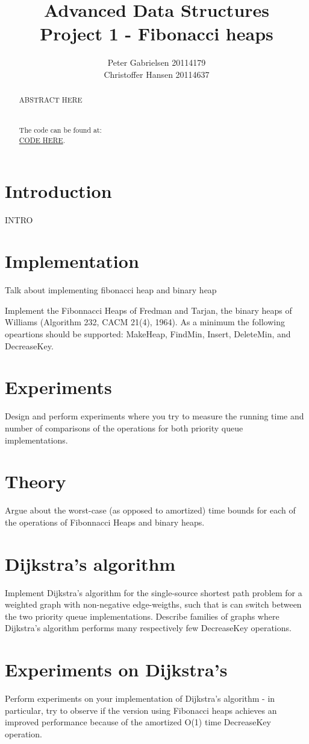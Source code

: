 \documentclass[a4paper,oneside,article,11pt]{memoir}
\title{Advanced Data Structures \\ Project 1 - Fibonacci heaps}
\author{Peter Gabrielsen 20114179 \\
Christoffer Hansen 20114637}
\begin{document}
\begin{titlingpage}
\clearpage

\maketitle
\thispagestyle{empty}

\begin{abstract}
ABSTRACT HERE
\\
\\
\\
The code can be found at: \\\url{CODE HERE}.
\end{abstract}
\end{titlingpage}

\pagebreak

\tableofcontents

\pagebreak

\chapter{Introduction}
INTRO

\chapter{Implementation}
Talk about implementing fibonacci heap and binary heap

Implement
the Fibonnacci Heaps of Fredman and Tarjan,
the binary heaps of Williams (Algorithm 232, CACM 21(4), 1964).
As a minimum the following opeartions should be supported: MakeHeap, FindMin, Insert, DeleteMin, and DecreaseKey.

\chapter{Experiments}
Design and perform experiments where you try to measure the running time and number of comparisons of the operations for both priority queue implementations.

\chapter{Theory}
Argue about the worst-case (as opposed to amortized) time bounds for each of the operations of Fibonnacci Heaps and binary heaps.

\chapter{Dijkstra's algorithm}
Implement Dijkstra's algorithm for the single-source shortest path problem for a weighted graph with non-negative edge-weigths, such that is can switch between the two priority queue implementations.
Describe families of graphs where Dijkstra's algorithm performs many respectively few DecreaseKey operations.

\chapter{Experiments on Dijkstra's}
Perform experiments on your implementation of Dijkstra's algorithm - in particular, try to observe if the version using Fibonacci heaps achieves an improved performance because of the amortized O(1) time DecreaseKey operation.



\end{document}
